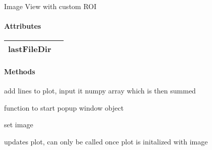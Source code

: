 \documentclass[letterpaper,10pt,english]{sphinxmanual}
\begin{document}
\begin{fulllineitems}
\label{ImageWindow:Dataplots.ImageWindow}
Image View with custom ROI
\paragraph{Attributes}

\begin{tabulary}{\linewidth}{|L|L|}
\hline

lastFileDir
 & \\
\hline\end{tabulary}

\paragraph{Methods}

\begin{fulllineitems}
\label{ImageWindow:Dataplots.ImageWindow.add_lines}
add lines to plot, input it numpy array which is then summed

\end{fulllineitems}


\begin{fulllineitems}
\label{ImageWindow:Dataplots.ImageWindow.popup}
function to start popup window object

\end{fulllineitems}


\begin{fulllineitems}
\label{ImageWindow:Dataplots.ImageWindow.setImage}
set image

\end{fulllineitems}


\begin{fulllineitems}
\label{ImageWindow:Dataplots.ImageWindow.updatePlot}
updates plot, can only be called once plot is initalized with image

\end{fulllineitems}


\end{fulllineitems}
\end{document}
